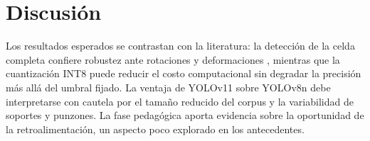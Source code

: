 \section{Discusión}

Los resultados esperados se contrastan con la literatura: la detección de la celda
completa confiere robustez ante rotaciones y deformaciones
\parencite{ovodov2021,sun2025}, mientras que la cuantización INT8 puede reducir
el costo computacional sin degradar la precisión más allá del umbral fijado. La
ventaja de YOLOv11 sobre YOLOv8n debe interpretarse con cautela por el tamaño
reducido del corpus y la variabilidad de soportes y punzones. La fase pedagógica
aporta evidencia sobre la oportunidad de la retroalimentación, un aspecto poco
explorado en los antecedentes.
